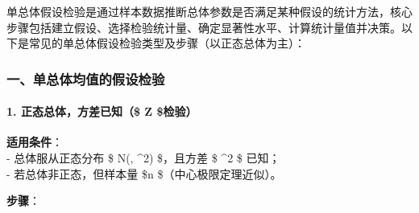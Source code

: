 单总体假设检验是通过样本数据推断总体参数是否满足某种假设的统计方法，核心步骤包括建立假设、选择检验统计量、确定显著性水平、计算统计量值并决策。以下是常见的单总体假设检验类型及步骤（以正态总体为主）：

\hypertarget{ux4e00ux5355ux603bux4f53ux5747ux503cux7684ux5047ux8bbeux68c0ux9a8c}{%
\subsubsection{\texorpdfstring{\textbf{一、单总体均值的假设检验}}{一、单总体均值的假设检验}}\label{ux4e00ux5355ux603bux4f53ux5747ux503cux7684ux5047ux8bbeux68c0ux9a8c}}

\hypertarget{ux6b63ux6001ux603bux4f53ux65b9ux5deeux5df2ux77e5-z-ux68c0ux9a8c}{%
\paragraph{\texorpdfstring{\textbf{1. 正态总体，方差已知（\$ Z
\$检验）}}{1. 正态总体，方差已知（\$ Z \$检验）}}\label{ux6b63ux6001ux603bux4f53ux65b9ux5deeux5df2ux77e5-z-ux68c0ux9a8c}}

\textbf{适用条件}：\\
- 总体服从正态分布 \$ N(\mu, \sigma\^{}2) \$，且方差 \$ \sigma\^{}2 \$
已知；\\
- 若总体非正态，但样本量 \$n  \$（中心极限定理近似）。

\textbf{步骤}：

